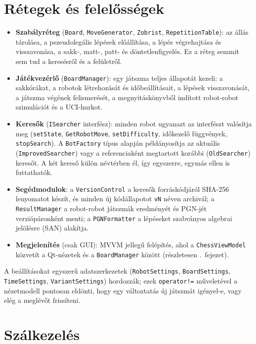 \section{Rétegek és felelősségek}

\begin{itemize}
	\item \textbf{Szabályréteg} (\texttt{Board}, \texttt{MoveGenerator}, \texttt{Zobrist}, \texttt{RepetitionTable}): az állás tárolása, a pszeudolegális lépések előállítása, a lépés végrehajtása és visszavonása, a sakk-, matt-, patt- és döntetlenfigyelés. Ez a réteg semmit sem tud a keresésről és a felületről.
	\item \textbf{Játékvezérlő} (\texttt{BoardManager}): egy játszma teljes állapotát kezeli: a sakkórákat, a robotok létrehozását és időbeállításait, a lépések visszavonását, a játszma végének felismerését, a megnyitáskönyvből indított robot-robot szimulációt és a UCI-hurkot.
	\item \textbf{Keresők} (\texttt{ISearcher} interfész): minden robot ugyanazt az interfészt valósítja meg (\texttt{setState}, \texttt{GetRobotMove}, \texttt{setDifficulty}, időkezelő függvények, \texttt{stopSearch}). A \texttt{BotFactory} típus alapján példányosítja az aktuális (\texttt{ImprovedSearcher}) vagy a referenciaként megtartott korábbi (\texttt{OldSearcher}) keresőt. A két kereső külön névtérben él, így egyszerre, egymás ellen is futtathatók.
	\item \textbf{Segédmodulok}: a \texttt{VersionControl} a keresők forráskódjáról SHA-256 lenyomatot készít, és minden új kódállapotot \texttt{vN} néven archivál; a \texttt{ResultManager} a robot-robot játszmák eredményét és PGN-jét verziópáronként menti; a \texttt{PGNFormatter} a lépéseket szabványos algebrai jelölésre (SAN) alakítja.
	\item \textbf{Megjelenítés} (csak GUI): MVVM jellegű felépítés, ahol a \texttt{ChessViewModel} közvetít a Qt-nézetek és a \texttt{BoardManager} között (részletesen .~fejezet).
\end{itemize}

A beállításokat egyszerű adatszerkezetek (\texttt{RobotSettings}, \texttt{BoardSettings}, \texttt{TimeSettings}, \texttt{VariantSettings}) hordozzák; ezek \texttt{operator!=} műveletével a nézetmodell pontosan eldönti, hogy egy változtatás új játszmát igényel-e, vagy elég a meglévőt frissíteni.

\section{Szálkezelés}


